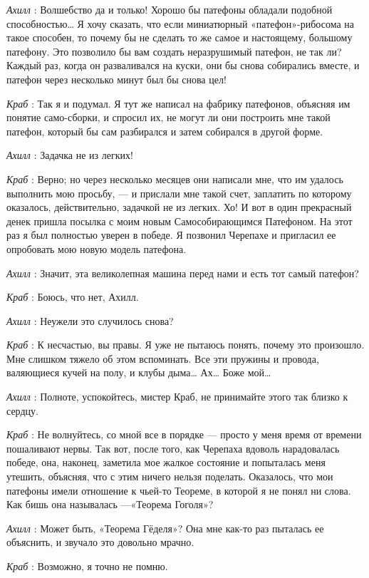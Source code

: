 \documentclass[../main.tex]{subfiles}
\begin{document}
\begin{dialogue}
\emph{Ахилл} : Волшебство да и только! Хорошо бы патефоны обладали подобной способностью\ldots{} Я хочу сказать, что если миниатюрный «патефон»-рибосома на такое способен, то почему бы не сделать то же самое и настоящему, большому патефону. Это позволило бы вам создать неразрушимый патефон, не так ли? Каждый раз, когда он разваливался на куски, они бы снова собирались вместе, и патефон через несколько минут был бы снова цел!

\emph{Краб} : Так я и подумал. Я тут же написал на фабрику патефонов, объясняя им понятие само-сборки, и спросил их, не могут ли они построить мне такой патефон, который бы сам разбирался и затем собирался в другой форме.

\emph{Ахилл} : Задачка не из легких!

\emph{Краб} : Верно; но через несколько месяцев они написали мне, что им удалось выполнить мою просьбу, --- и прислали мне такой счет, заплатить по которому оказалось, действительно, задачкой не из легких. Хо! И вот в один прекрасный денек пришла посылка с моим новым Самособирающимся Патефоном. На этот раз я был полностью уверен в победе. Я позвонил Черепахе и пригласил ее опробовать мою новую модель патефона.

\emph{Ахилл} : Значит, эта великолепная машина перед нами и есть тот самый патефон?

\emph{Краб} : Боюсь, что нет, Ахилл.

\emph{Ахилл} : Неужели это случилось снова?

\emph{Краб} : К несчастью, вы правы. Я уже не пытаюсь понять, почему это произошло. Мне слишком тяжело об этом вспоминать. Все эти пружины и провода, валяющиеся кучей на полу, и клубы дыма\ldots{} Ах\ldots{} Боже мой\ldots{}

\emph{Ахилл} : Полноте, успокойтесь, мистер Краб, не принимайте этого так близко к сердцу.

\emph{Краб} : Не волнуйтесь, со мной все в порядке --- просто у меня время от времени пошаливают нервы. Так вот, после того, как Черепаха вдоволь нарадовалась победе, она, наконец, заметила мое жалкое состояние и попыталась меня утешить, объясняя, что с этим ничего нельзя поделать. Оказалось, что мои патефоны имели отношение к чьей-то Теореме, в которой я не понял ни слова. Как бишь она называлась ---«Теорема Гоголя»?

\emph{Ахилл} : Может быть, «Теорема Гёделя»? Она мне как-то раз пыталась ее объяснить, и звучало это довольно мрачно.

\emph{Краб} : Возможно, я точно не помню.


\end{dialogue}
\end{document}
